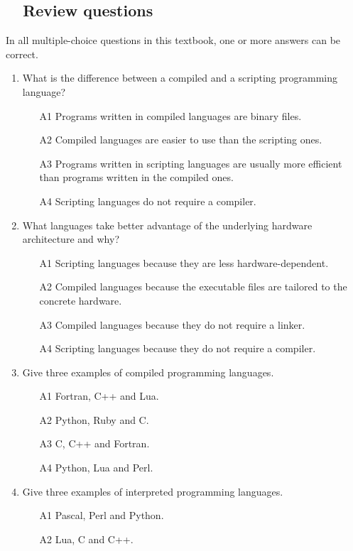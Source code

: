 \subsection{\ \ Review questions}

In all multiple-choice questions in this textbook, one or more answers can be correct. 
\begin{enumerate}
\item What is the difference between a compiled and a scripting programming language?
\begin{enumerate}
\item[A1] Programs written in compiled languages are binary files. 
\item[A2] Compiled languages are easier to use than the scripting ones.
\item[A3] Programs written in scripting languages are usually more efficient than programs 
          written in the compiled ones.
\item[A4] Scripting languages do not require a compiler.
\end{enumerate}
\item What languages take better advantage of the underlying hardware architecture
      and why?
\begin{enumerate}
\item[A1] Scripting languages because they are less hardware-dependent.
\item[A2] Compiled languages because the executable files are tailored 
          to the concrete hardware.
\item[A3] Compiled languages because  they do not require a linker.
\item[A4] Scripting languages because they do not require a compiler.
\end{enumerate}
\item Give three examples of compiled programming languages.
\begin{enumerate}
\item[A1] Fortran, C++ and Lua.
\item[A2] Python, Ruby and C.
\item[A3] C, C++ and Fortran.
\item[A4] Python, Lua and Perl.
\end{enumerate}
\item Give three examples of interpreted programming languages.
\begin{enumerate}
\item[A1] Pascal, Perl and Python.
\item[A2] Lua, C and C++.

\end{enumerate}
\end{enumerate}
